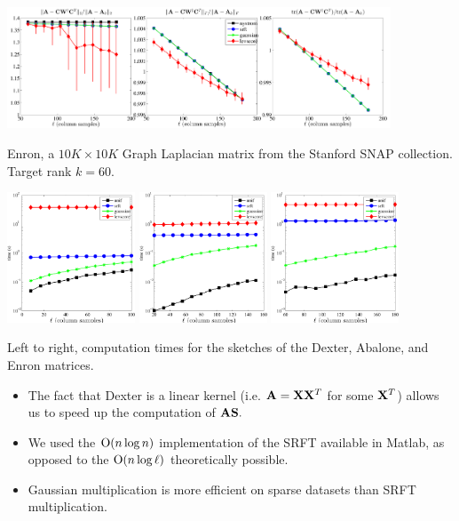 \documentclass[xcolor=x11names,compress,ignorenonframetext,10pt]{beamer}
\renewcommand{\(}{\begin{columns}}
\renewcommand{\)}{\end{columns}}
\newcommand{\<}[1]{\begin{column}{#1}}
\renewcommand{\>}{\end{column}}
\begin{document}
\begin{frame}
 
  \centerline{\includegraphics[width=4.5in, keepaspectratio=true]{figures/spsd/Enronrank60exact-methods-nonfixed-rank-errors-range}}
 Enron, a $10K \times 10K$ Graph Laplacian matrix from the Stanford SNAP collection. Target
 rank $k = 60.$ 
\end{frame}


\begin{frame}
 \centerline{%
   \includegraphics[width=1.5in,keepaspectratio=true]{figures/spsd/Dexterrank8exact-methods-timings.pdf}%
   \includegraphics[width=1.5in,keepaspectratio=true]{figures/spsd/Abalonesigma1exact-methods-timings.pdf}%
   \includegraphics[width=1.5in,keepaspectratio=true]{figures/spsd/Enronrank60exact-methods-timings.pdf}}
Left to right, computation times for the sketches of the Dexter, Abalone, and Enron matrices.
\begin{itemize}
 \item The fact that Dexter is a linear kernel (i.e. $\mathbf{A} = \mathbf{X} \mathbf{X}^T$ for some $\mathbf{X}^T$)
  allows us to speed up the computation of $\mathbf{A} \mathbf{S}.$
 \item We used the $\mathrm{O}(n \log n)$ implementation of the SRFT available in Matlab, 
  as opposed to the $\mathrm{O}(n \log \ell)$ theoretically possible.
 \item Gaussian multiplication is more efficient on sparse datasets than SRFT multiplication.
\end{itemize}

\end{frame}
\end{document}
